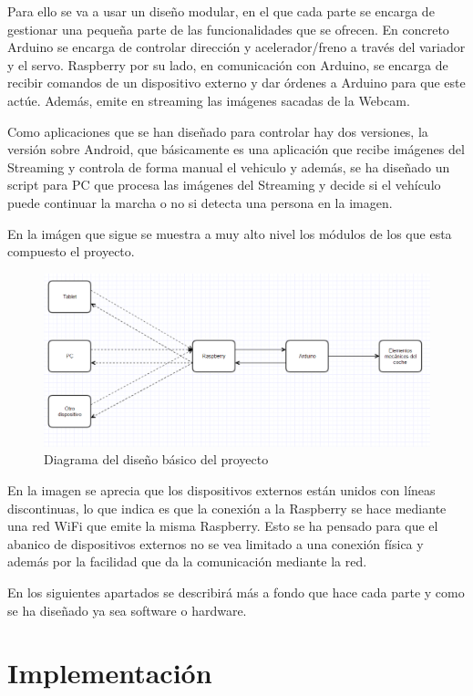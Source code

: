 \documentclass{pclass}
\begin{document}
Para ello se va a usar un diseño modular, en el que cada parte se encarga de gestionar una pequeña parte de las funcionalidades que se ofrecen. En concreto Arduino se encarga de controlar dirección y acelerador/freno a través del variador y el servo. Raspberry por su lado, en comunicación con Arduino, se encarga de recibir comandos de un dispositivo externo y dar órdenes a Arduino para que este actúe. Además, emite en streaming las imágenes sacadas de la Webcam. 

Como aplicaciones que se han diseñado para controlar hay dos versiones, la versión sobre Android, que básicamente es una aplicación que recibe imágenes del Streaming y controla de forma manual el vehiculo y además, se ha diseñado un script para PC que procesa las imágenes del Streaming y decide si el vehículo puede continuar la marcha o no si detecta una persona en la imagen.

En la imágen que sigue se muestra a muy alto nivel los módulos de los que esta compuesto el proyecto.

	\begin{figure}[H]
		\centering
		\includegraphics[width=1\textwidth]{img/diseno}
		\caption{Diagrama del diseño básico del proyecto}
		\label{fig:diseno}
	\end{figure}

En la imagen se aprecia que los dispositivos externos están unidos con líneas discontinuas, lo que indica es que la conexión a la Raspberry se hace mediante una red WiFi que emite la misma Raspberry. Esto se ha pensado para que el abanico de dispositivos externos no se vea limitado a una conexión física y además por la facilidad que da la comunicación mediante la red.

En los siguientes apartados se describirá más a fondo que hace cada parte y como se ha diseñado ya sea software o hardware.
 
\section{Implementación} 
\end{document}
